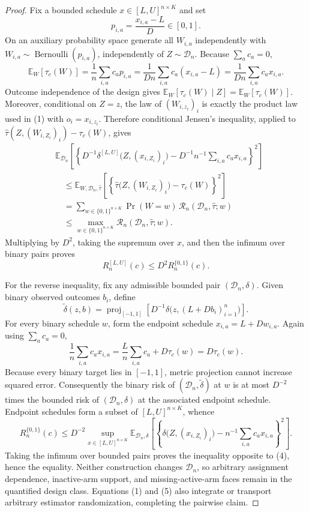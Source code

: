 \documentclass{article}
\begin{document}
\begin{proof}
Fix a bounded schedule \(x\in[L,U]^{n\times K}\) and set
\[
p_{i,a}=\frac{x_{i,a}-L}{D}\in[0,1].
\]
On an auxiliary probability space generate all \(W_{i,a}\) independently with \(W_{i,a}\sim\operatorname{Bernoulli}(p_{i,a})\), independently of \(Z\sim\mathcal D_n\).  Because \(\sum_a c_a=0\),
\[
\mathbb E_W\!\left[\tau_c(W)\right]
=\frac1n\sum_{i,a}c_ap_{i,a}
=\frac{1}{D n}\sum_{i,a}c_a(x_{i,a}-L)
=\frac{1}{D n}\sum_{i,a}c_ax_{i,a}.
\tag{2}
\]
Outcome independence of the design gives \(\mathbb E_W[\tau_c(W)\mid Z]=\mathbb E_W[\tau_c(W)]\).  Moreover, conditional on \(Z=z\), the law of \((W_{i,z_i})_i\) is exactly the product law used in (1) with \(o_i=x_{i,z_i}\).  Therefore conditional Jensen's inequality, applied to
\(\widehat\tau(Z,(W_{i,Z_i})_i)-\tau_c(W)\), gives
\[
\begin{aligned}
&\mathbb E_{\mathcal D_n}
\left[
\left\{
D^{-1}\delta^{[L,U]}\bigl(Z,(x_{i,Z_i})_i\bigr)
-D^{-1}n^{-1}\sum_{i,a}c_ax_{i,a}
\right\}^{2}
\right]\\
&\quad\le
\mathbb E_{W,\mathcal D_n,\widehat\tau}
\left[
\left\{
\widehat\tau\bigl(Z,(W_{i,Z_i})_i\bigr)-\tau_c(W)
\right\}^{2}
\right]\\
&\quad=
\sum_{w\in\{0,1\}^{n\times K}}
\Pr(W=w)\,
\mathcal R_n(\mathcal D_n,\widehat\tau;w)\\
&\quad\le
\max_{w\in\{0,1\}^{n\times K}}
\mathcal R_n(\mathcal D_n,\widehat\tau;w).
\end{aligned}
\tag{3}
\]
Multiplying by \(D^2\), taking the supremum over \(x\), and then the infimum over binary pairs proves
\[
R_n^{[L,U]}(c)\le D^2R_n^{\{0,1\}}(c).
\tag{4}
\]

For the reverse inequality, fix any admissible bounded pair \((\mathcal D_n,\delta)\).  Given binary observed outcomes \(b_i\), define
\[
\widetilde\delta(z,b)=\operatorname{proj}_{[-1,1]}\!\left[D^{-1}\delta\bigl(z,(L+Db_i)_{i=1}^n\bigr)\right].
\tag{5}
\]
For every binary schedule \(w\), form the endpoint schedule \(x_{i,a}=L+Dw_{i,a}\).  Again using \(\sum_a c_a=0\),
\[
\frac1n\sum_{i,a}c_ax_{i,a}
=\frac{L}{n}\sum_{i,a}c_a+D\tau_c(w)
=D\tau_c(w).
\tag{6}
\]
Because every binary target lies in \([-1,1]\), metric projection cannot increase squared error. Consequently the binary risk of \((\mathcal D_n,\widetilde\delta)\) at \(w\) is at most \(D^{-2}\) times the bounded risk of \((\mathcal D_n,\delta)\) at the associated endpoint schedule.  Endpoint schedules form a subset of \([L,U]^{n\times K}\), whence
\[
R_n^{\{0,1\}}(c)
\le D^{-2}
\sup_{x\in[L,U]^{n\times K}}
\mathbb E_{\mathcal D_n,\delta}
\left[
\left\{
\delta\bigl(Z,(x_{i,Z_i})_i\bigr)
-n^{-1}\sum_{i,a}c_ax_{i,a}
\right\}^{2}
\right].
\tag{7}
\]
Taking the infimum over bounded pairs proves the inequality opposite to (4), hence the equality.  Neither construction changes \(\mathcal D_n\), so arbitrary assignment dependence, inactive-arm support, and missing-active-arm faces remain in the quantified design class.  Equations (1) and (5) also integrate or transport arbitrary estimator randomization, completing the pairwise claim.
\end{proof}
\end{document}
